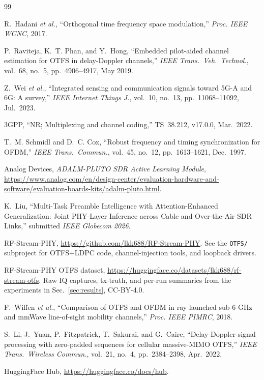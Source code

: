 \documentclass[conference,10pt]{IEEEtran}
\begin{document}
\begin{thebibliography}{99}

R.~Hadani \emph{et al.}, ``Orthogonal time frequency space modulation,''
\emph{Proc. IEEE WCNC}, 2017.

P.~Raviteja, K.~T. Phan, and Y.~Hong, ``Embedded pilot-aided channel estimation for OTFS in delay-Doppler channels,''
\emph{IEEE Trans.\ Veh.\ Technol.}, vol.~68, no.~5, pp.~4906--4917, May 2019.

Z.~Wei \emph{et al.}, ``Integrated sensing and communication signals toward 5G-A and 6G: A survey,''
\emph{IEEE Internet Things J.}, vol.~10, no.~13, pp.~11068--11092, Jul.\ 2023.

3GPP, ``NR; Multiplexing and channel coding,''
TS~38.212, v17.0.0, Mar.\ 2022.

T.~M. Schmidl and D.~C. Cox, ``Robust frequency and timing synchronization for OFDM,''
\emph{IEEE Trans.\ Commun.}, vol.~45, no.~12, pp.~1613--1621, Dec.\ 1997.

Analog Devices, \emph{ADALM-PLUTO SDR Active Learning Module},
\url{https://www.analog.com/en/design-center/evaluation-hardware-and-software/evaluation-boards-kits/adalm-pluto.html}.

K.~Liu, ``Multi-Task Preamble Intelligence with Attention-Enhanced Generalization: Joint PHY-Layer Inference across Cable and Over-the-Air SDR Links,'' submitted \emph{IEEE Globecom 2026}.

RF-Stream-PHY,
\url{https://github.com/lkk688/RF-Stream-PHY}.  See the \texttt{OTFS/} subproject for OTFS+LDPC code, channel-injection tools, and loopback drivers.

RF-Stream-PHY OTFS dataset,
\url{https://huggingface.co/datasets/lkk688/rf-stream-otfs}.  Raw IQ captures, tx-truth, and per-run summaries from the experiments in Sec.~\ref{sec:results}, CC-BY-4.0.

F.~Wiffen \emph{et al.}, ``Comparison of OTFS and OFDM in ray launched sub-6 GHz and mmWave line-of-sight mobility channels,''
\emph{Proc. IEEE PIMRC}, 2018.

S.~Li, J.~Yuan, P.~Fitzpatrick, T.~Sakurai, and G.~Caire, ``Delay-Doppler signal processing with zero-padded sequences for cellular massive-MIMO OTFS,''
\emph{IEEE Trans.\ Wireless Commun.}, vol.~21, no.~4, pp.~2384--2398, Apr.\ 2022.

HuggingFace Hub,
\url{https://huggingface.co/docs/hub}.

\end{thebibliography}
\end{document}
